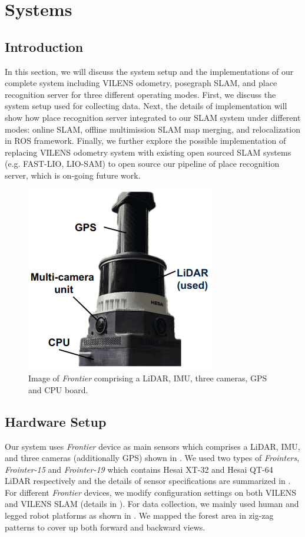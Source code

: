 \chapter{Systems}
\label{ch:system}
\section{Introduction}
In this section, we will discuss the system setup and the implementations of our complete system including VILENS odometry, posegraph SLAM, and place recognition server for three different operating modes. First, we discuss the system setup used for collecting data. Next, the details of implementation will show how place recognition server integrated to our SLAM system under different modes: online SLAM, offline multimission SLAM map merging, and relocalization in ROS framework. Finally, we further explore the possible implementation of replacing VILENS odometry system with existing open sourced SLAM systems (e.g. FAST-LIO, LIO-SAM) to open source our pipeline of place recognition server, which is on-going future work. 

\begin{figure}[t]
  \centering
  \includegraphics[width=0.4\columnwidth]{pics/setup_Frontier_pic2.png}
  \caption{Image of \emph{Frontier} comprising a LiDAR, IMU, three cameras, GPS and CPU board. }
  \label{fig:frontier}
\end{figure}

\section{Hardware Setup}
\label{sec:system_setup}
Our system uses \emph{Frontier} device as main sensors which comprises a LiDAR, IMU, and three cameras (additionally GPS) shown in . We used two types of \emph{Frointers}, \emph{Frointer-15} and \emph{Frointer-19} which contains Hesai XT-32 and Hesai QT-64 LiDAR respectively and the details of sensor specifications are summarized in . For different \emph{Frontier} devices, we modify configuration settings on both VILENS and VILENS SLAM (details in \cite{wisth2023tro,proudman2022ras}). For data collection, we mainly used human and legged robot platforms as shown in . We mapped the forest area in zig-zag patterns to cover up both forward and backward views. 



